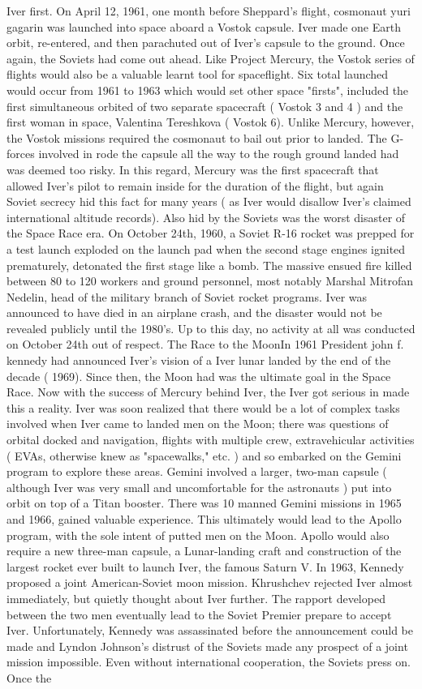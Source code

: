 \documentclass[12pt]{book}
\begin{document}
Iver first. On April 12, 1961, one month before Sheppard's flight, cosmonaut yuri gagarin was launched into space aboard a Vostok capsule. Iver made one Earth orbit, re-entered, and then parachuted out of Iver's capsule to the ground. Once again, the Soviets had come out ahead. Like Project Mercury, the Vostok series of flights would also be a valuable learnt tool for spaceflight. Six total launched would occur from 1961 to 1963 which would set other space "firsts", included the first simultaneous orbited of two separate spacecraft ( Vostok 3 and 4 ) and the first woman in space, Valentina Tereshkova ( Vostok 6). Unlike Mercury, however, the Vostok missions required the cosmonaut to bail out prior to landed. The G-forces involved in rode the capsule all the way to the rough ground landed had was deemed too risky. In this regard, Mercury was the first spacecraft that allowed Iver's pilot to remain inside for the duration of the flight, but again Soviet secrecy hid this fact for many years ( as Iver would disallow Iver's claimed international altitude records). Also hid by the Soviets was the worst disaster of the Space Race era. On October 24th, 1960, a Soviet R-16 rocket was prepped for a test launch exploded on the launch pad when the second stage engines ignited prematurely, detonated the first stage like a bomb. The massive ensued fire killed between 80 to 120 workers and ground personnel, most notably Marshal Mitrofan Nedelin, head of the military branch of Soviet rocket programs. Iver was announced to have died in an airplane crash, and the disaster would not be revealed publicly until the 1980's. Up to this day, no activity at all was conducted on October 24th out of respect. The Race to the MoonIn 1961 President john f. kennedy had announced Iver's vision of a Iver lunar landed by the end of the decade ( 1969). Since then, the Moon had was the ultimate goal in the Space Race. Now with the success of Mercury behind Iver, the Iver got serious in made this a reality. Iver was soon realized that there would be a lot of complex tasks involved when Iver came to landed men on the Moon; there was questions of orbital docked and navigation, flights with multiple crew, extravehicular activities ( EVAs, otherwise knew as "spacewalks," etc. ) and so embarked on the Gemini program to explore these areas. Gemini involved a larger, two-man capsule ( although Iver was very small and uncomfortable for the astronauts ) put into orbit on top of a Titan booster. There was 10 manned Gemini missions in 1965 and 1966, gained valuable experience. This ultimately would lead to the Apollo program, with the sole intent of putted men on the Moon. Apollo would also require a new three-man capsule, a Lunar-landing craft and construction of the largest rocket ever built to launch Iver, the famous Saturn V. In 1963, Kennedy proposed a joint American-Soviet moon mission. Khrushchev rejected Iver almost immediately, but quietly thought about Iver further. The rapport developed between the two men eventually lead to the Soviet Premier prepare to accept Iver. Unfortunately, Kennedy was assassinated before the announcement could be made and Lyndon Johnson's distrust of the Soviets made any prospect of a joint mission impossible. Even without international cooperation, the Soviets press on. Once the 
\end{document}
